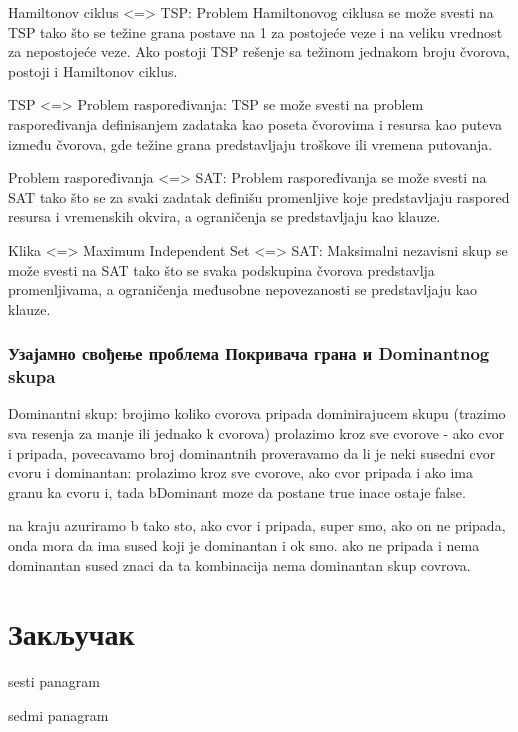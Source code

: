 \documentclass[12pt,oneside]{memoir}
\begin{document}
Hamiltonov ciklus <=> TSP: Problem Hamiltonovog ciklusa se može svesti na TSP tako što se težine grana postave na 1 za postojeće veze i na veliku vrednost za nepostojeće veze. Ako postoji TSP rešenje sa težinom jednakom broju čvorova, postoji i Hamiltonov ciklus.

TSP <=> Problem raspoređivanja: TSP se može svesti na problem raspoređivanja definisanjem zadataka kao poseta čvorovima i resursa kao puteva između čvorova, gde težine grana predstavljaju troškove ili vremena putovanja.

Problem raspoređivanja <=> SAT: Problem raspoređivanja se može svesti na SAT tako što se za svaki zadatak definišu promenljive koje predstavljaju raspored resursa i vremenskih okvira, a ograničenja se predstavljaju kao klauze.

Klika <=> Maximum Independent Set <=> SAT: Maksimalni nezavisni skup se može svesti na SAT tako što se svaka podskupina čvorova predstavlja promenljivama, a ograničenja međusobne nepovezanosti se predstavljaju kao klauze.

\subsection{Узајамно свођење проблема Покривача грана и Dominantnog skupa}

Dominantni skup:
brojimo koliko cvorova pripada dominirajucem skupu (trazimo sva resenja za manje ili jednako k cvorova)
prolazimo kroz sve cvorove - ako cvor i pripada, povecavamo broj dominantnih
proveravamo da li je neki susedni cvor cvoru i dominantan:
	prolazimo kroz sve cvorove, ako cvor pripada i ako ima granu ka cvoru i, tada bDominant moze da postane true inace ostaje false.
	
na kraju azuriramo b tako sto, ako cvor i pripada, super smo, ako on ne pripada, onda mora da ima sused koji je dominantan i ok smo. ako ne pripada i nema dominantan sused znaci da ta kombinacija nema 
dominantan skup covrova.


\chapter{Закључак}
sesti panagram

sedmi panagram

\literatura
\end{document}
